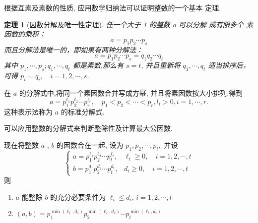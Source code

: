 \documentclass[13pt,punct]{ctexbeamer}
\newtheorem{thm}{定理}
\begin{document}
 \begin{frame}
根据互素及素数的性质, 应用数学归纳法可以证明整数的一个基本
定理.
\begin{thm}[因数分解及唯一性定理]
任一个大于 1 的整数 a 可以分解 成有限多个 素因数的乘积：
\[
a=p_{1} p_{2} \cdots p_{s}
\]
而且分解法是唯一的，即如果有两种分解法：
\[
a=p_{1} p_{2} \cdots p_{s}= q_{1} q_{2} \cdots q_{t}
\]
其中 $p_{1}, \cdots, p_{s} ; q_{1}, \cdots, q_{t}$ 都是素数,那么有 $s=t$,  并且重新将 $q_{1}, \cdots, q_{t}$ 适当排序后，可得
$p_{i}=q_{i}, \quad i=1,2, \cdots, s$.
\end{thm}
\end{frame}


\begin{frame}
在 $a$ 的分解式中,将同一个素因数合并写成方幂, 并且将素因数按大小排列,得到
\[
a=p_{1}^{\ell_{1}} p_{2}^{\ell_{2}} \cdots p_{r}^{\ell_r},  \quad p_{1}<p_{2}<\cdots<p_{r}, l_{i}>0, i=1, \cdots, r.
\]
这种表示法称为 $a$ 的\alert{标准分解式}.

可以应用整数的分解式来判断整除性及计算最大公因数.

现在将整数 $a$ , $b$ 的因数合在一起, 设为 $p_{1}, p_{2}, \cdots, p_{t},$ 并设
\begin{equation}\label{eq-1}
\left\{\begin{array}{ll}
a=p_{1}^{\ell_{1}} p_{2}^{\ell_{2}} \cdots p_{t}^{\ell_t}, & \ell_{i} \geqslant 0,  \quad i=1,2, \cdots, t \\
b=p_{1}^{d_{1}} p_{2}^{d_{2}} \cdots p_{t}^{d_t}, & d_{i} \geqslant 0,  \quad i=1,2, \cdots, t
\end{array}\right.
\end{equation}
则
\begin{enumerate}
\item $a$ 能整除 $b$ 的充分必要条件为
$
\ell_{i} \leqslant d_{i},\,  i=1,2, \cdots, t
$
\item
$
(a, b)=p_{1}^{\min \left(\ell_{1}, d_{1}\right)} p_{2}^{\min \left(\ell_{2}, d_{2}\right)}\cdots p_{t}^{\min \left(\ell_{t}, d_{t}\right)}
$
\end{enumerate}

\end{frame}
\end{document}
